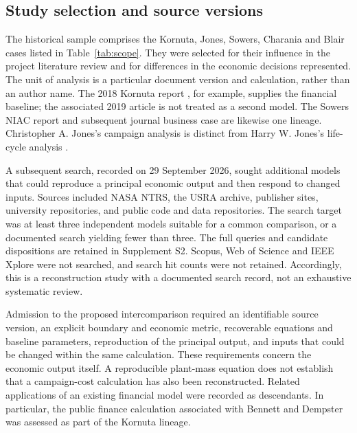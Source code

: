 \documentclass[final,5p,times,twocolumn]{elsarticle}
\begin{document}
\subsection{Study selection and source versions}
The historical sample comprises the Kornuta, Jones, Sowers, Charania and Blair cases listed in Table~\ref{tab:scope}. They were selected for their influence in the project literature review and for differences in the economic decisions represented. The unit of analysis is a particular document version and calculation, rather than an author name. The 2018 Kornuta report \cite{kornuta2018}, for example, supplies the financial baseline; the associated 2019 article \cite{kornuta2019} is not treated as a second model. The Sowers NIAC report and subsequent journal business case are likewise one lineage. Christopher A. Jones's campaign analysis \cite{jones2020} is distinct from Harry W. Jones's life-cycle analysis \cite{jones2021}.

A subsequent search, recorded on 29 September 2026, sought additional models that could reproduce a principal economic output and then respond to changed inputs. Sources included NASA NTRS, the USRA archive, publisher sites, university repositories, and public code and data repositories. The search target was at least three independent models suitable for a common comparison, or a documented search yielding fewer than three. The full queries and candidate dispositions are retained in Supplement S2. Scopus, Web of Science and IEEE Xplore were not searched, and search hit counts were not retained. Accordingly, this is a reconstruction study with a documented search record, not an exhaustive systematic review.

Admission to the proposed intercomparison required an identifiable source version, an explicit boundary and economic metric, recoverable equations and baseline parameters, reproduction of the principal output, and inputs that could be changed within the same calculation. These requirements concern the economic output itself. A reproducible plant-mass equation does not establish that a campaign-cost calculation has also been reconstructed. Related applications of an existing financial model were recorded as descendants. In particular, the public finance calculation associated with Bennett and Dempster \cite{bennett2020} was assessed as part of the Kornuta lineage.
\end{document}
